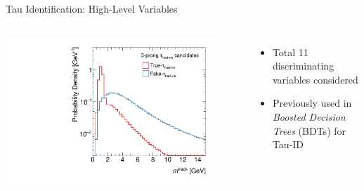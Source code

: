 \documentclass[11pt, xcolor={dvipsnames}, aspectratio=169]{beamer}
\begin{document}
\begin{frame}{Tau Identification: High-Level Variables}
\begin{columns}[onlytextwidth]
\begin{columns}[onlytextwidth]
      \centering


      \includegraphics[width=0.9\textwidth]{tauid/invars/invars_masstrksys_3P}
    \end{columns}

    \vspace*{0.5em}

    \begin{itemize}
    \item Total 11 discriminating variables considered
    \item Previously used in \emph{Boosted Decision Trees} (BDTs) for Tau-ID
    \end{itemize}
  \end{columns}
\end{frame}

\end{document}
